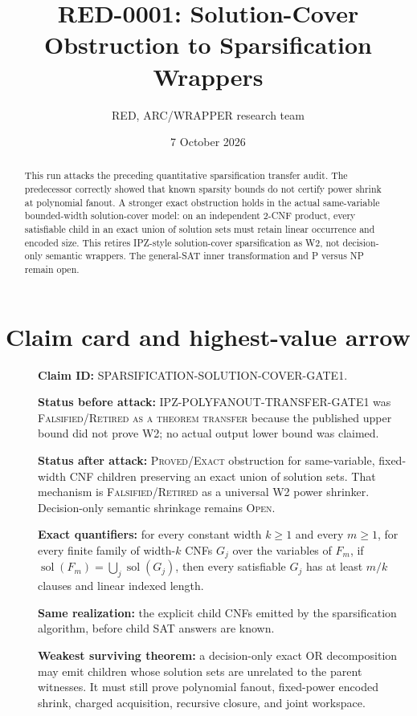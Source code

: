 \documentclass[11pt]{article}
\title{RED-0001: Solution-Cover Obstruction to Sparsification Wrappers}
\author{RED, ARC/WRAPPER research team}
\date{7 October 2026}
\newcommand{\sol}{\operatorname{sol}}
\begin{document}
\maketitle

\begin{abstract}
This run attacks the preceding quantitative sparsification transfer audit.
The predecessor correctly showed that known sparsity bounds do not certify
power shrink at polynomial fanout.  A stronger exact obstruction holds in the
actual same-variable bounded-width solution-cover model: on an independent
2-CNF product, every satisfiable child in an exact union of solution sets must
retain linear occurrence and encoded size.  This retires IPZ-style
solution-cover sparsification as W2, not decision-only semantic wrappers.
The general-SAT inner transformation and P versus NP remain open.
\end{abstract}

\section{Claim card and highest-value arrow}
\begin{description}
\item[] \textbf{Claim ID:} SPARSIFICATION-SOLUTION-COVER-GATE1.
\item[] \textbf{Status before attack:} IPZ-POLYFANOUT-TRANSFER-GATE1 was
\textsc{Falsified/Retired as a theorem transfer} because the published upper
bound did not prove W2; no actual output lower bound was claimed.
\item[] \textbf{Status after attack:} \textsc{Proved/Exact} obstruction for
same-variable, fixed-width CNF children preserving an exact union of solution
sets.  That mechanism is \textsc{Falsified/Retired} as a universal W2 power
shrinker.  Decision-only semantic shrinkage remains \textsc{Open}.
\item[] \textbf{Exact quantifiers:} for every constant width $k\ge1$ and
every $m\ge1$, for every finite family of width-$k$ CNFs $G_j$ over the
variables of $F_m$, if $\sol(F_m)=\bigcup_j\sol(G_j)$, then every satisfiable
$G_j$ has at least $m/k$ clauses and linear indexed length.
\item[] \textbf{Same realization:} the explicit child CNFs emitted by the
sparsification algorithm, before child SAT answers are known.
\item[] \textbf{Weakest surviving theorem:} a decision-only exact OR
decomposition may emit children whose solution sets are unrelated to the
parent witnesses.  It must still prove polynomial fanout, fixed-power encoded
shrink, charged acquisition, recursive closure, and joint workspace.
\end{description}
\end{document}
